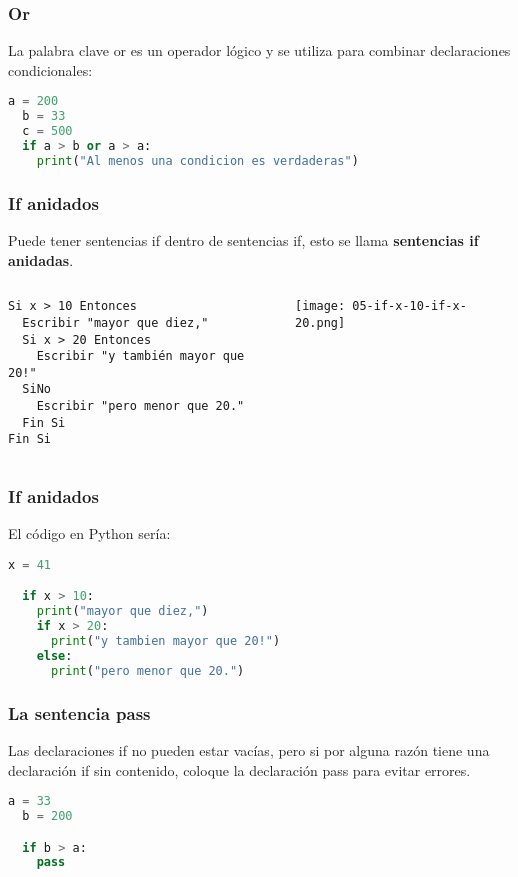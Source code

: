 \begin{frame}[fragile]
  \frametitle{Or}

  La palabra clave \textcolor{codeKeyword}{or} es un operador lógico y
  se utiliza para combinar declaraciones condicionales:

  \vspace{\baselineskip}
  \begin{lstlisting}[language=Python]
  a = 200
  b = 33
  c = 500
  if a > b or a > a:
    print("Al menos una condicion es verdaderas")
  \end{lstlisting}
\end{frame}

\begin{frame}[fragile]
  \frametitle{If anidados}

  Puede tener sentencias if dentro de sentencias if, esto se llama
  \textbf{sentencias if anidadas}.

  \begin{columns}
    \begin{lstlisting}[style=pseudocodigo]
Si x > 10 Entonces
  Escribir "mayor que diez,"
  Si x > 20 Entonces
    Escribir "y también mayor que 20!"
  SiNo
    Escribir "pero menor que 20."
  Fin Si
Fin Si\end{lstlisting}
    \pausa
    \texttt{[image: 05-if-x-10-if-x-20.png]}
  \end{columns}
\end{frame}

\begin{frame}[fragile]
  \frametitle{If anidados}

  El código en Python sería:

  \vspace{\baselineskip}
  \begin{lstlisting}[language=Python]
  x = 41

  if x > 10:
    print("mayor que diez,")
    if x > 20:
      print("y tambien mayor que 20!")
    else:
      print("pero menor que 20.")
  \end{lstlisting}
\end{frame}

\begin{frame}[fragile]
  \frametitle{La sentencia \textbf{pass}}

  Las declaraciones if no pueden estar vacías, pero si por alguna razón
  tiene una declaración if sin contenido, coloque la declaración pass
  para evitar errores.

  \vspace{\baselineskip}
  \begin{lstlisting}[language=Python]
  a = 33
  b = 200

  if b > a:
    pass
  \end{lstlisting}
\end{frame}

